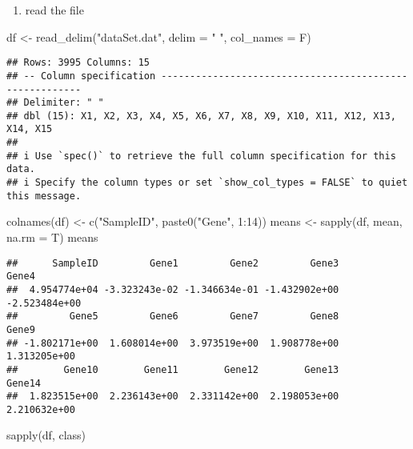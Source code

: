 \documentclass[
]{article}
\newenvironment{Shaded}{\begin{snugshade}}{\end{snugshade}}
\newcommand{\AttributeTok}[1]{\textcolor[rgb]{0.77,0.63,0.00}{#1}}
\newcommand{\DecValTok}[1]{\textcolor[rgb]{0.00,0.00,0.81}{#1}}
\newcommand{\FunctionTok}[1]{\textcolor[rgb]{0.00,0.00,0.00}{#1}}
\newcommand{\NormalTok}[1]{#1}
\newcommand{\OtherTok}[1]{\textcolor[rgb]{0.56,0.35,0.01}{#1}}
\newcommand{\SpecialCharTok}[1]{\textcolor[rgb]{0.00,0.00,0.00}{#1}}
\newcommand{\StringTok}[1]{\textcolor[rgb]{0.31,0.60,0.02}{#1}}
\providecommand{\tightlist}{%
  \setlength{\itemsep}{0pt}\setlength{\parskip}{0pt}}
\begin{document}
\begin{enumerate}
\def\labelenumi{\roman{enumi})}
\tightlist
\item
  read the file
\end{enumerate}

\begin{Shaded}
\begin{Highlighting}[]
\NormalTok{df }\OtherTok{\textless{}{-}} \FunctionTok{read\_delim}\NormalTok{(}\StringTok{"dataSet.dat"}\NormalTok{, }\AttributeTok{delim =} \StringTok{" "}\NormalTok{, }\AttributeTok{col\_names =}\NormalTok{ F)}
\end{Highlighting}
\end{Shaded}

\begin{verbatim}
## Rows: 3995 Columns: 15
## -- Column specification --------------------------------------------------------
## Delimiter: " "
## dbl (15): X1, X2, X3, X4, X5, X6, X7, X8, X9, X10, X11, X12, X13, X14, X15
## 
## i Use `spec()` to retrieve the full column specification for this data.
## i Specify the column types or set `show_col_types = FALSE` to quiet this message.
\end{verbatim}

\begin{Shaded}
\begin{Highlighting}[]
\FunctionTok{colnames}\NormalTok{(df) }\OtherTok{\textless{}{-}} \FunctionTok{c}\NormalTok{(}\StringTok{"SampleID"}\NormalTok{, }\FunctionTok{paste0}\NormalTok{(}\StringTok{"Gene"}\NormalTok{, }\DecValTok{1}\SpecialCharTok{:}\DecValTok{14}\NormalTok{))}
\NormalTok{means }\OtherTok{\textless{}{-}} \FunctionTok{sapply}\NormalTok{(df, mean, }\AttributeTok{na.rm =}\NormalTok{ T)}
\NormalTok{means}
\end{Highlighting}
\end{Shaded}

\begin{verbatim}
##      SampleID         Gene1         Gene2         Gene3         Gene4 
##  4.954774e+04 -3.323243e-02 -1.346634e-01 -1.432902e+00 -2.523484e+00 
##         Gene5         Gene6         Gene7         Gene8         Gene9 
## -1.802171e+00  1.608014e+00  3.973519e+00  1.908778e+00  1.313205e+00 
##        Gene10        Gene11        Gene12        Gene13        Gene14 
##  1.823515e+00  2.236143e+00  2.331142e+00  2.198053e+00  2.210632e+00
\end{verbatim}

\begin{Shaded}
\begin{Highlighting}[]
\FunctionTok{sapply}\NormalTok{(df, class)}
\end{Highlighting}
\end{Shaded}
\end{document}
